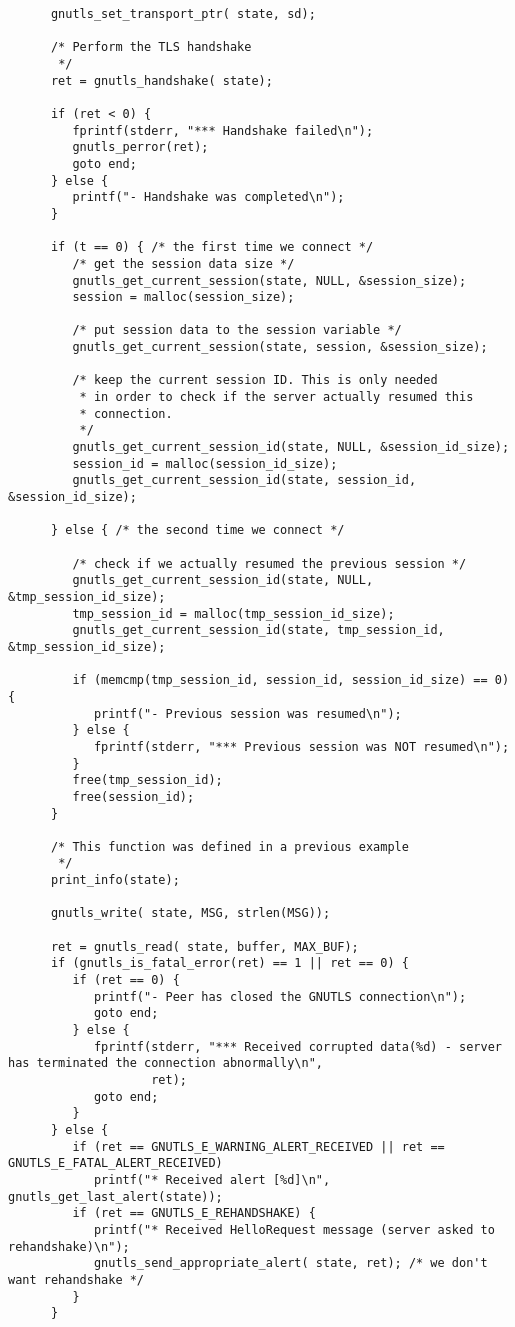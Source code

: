 \begin{verbatim}
      gnutls_set_transport_ptr( state, sd);

      /* Perform the TLS handshake
       */
      ret = gnutls_handshake( state);

      if (ret < 0) {
         fprintf(stderr, "*** Handshake failed\n");
         gnutls_perror(ret);
         goto end;
      } else {
         printf("- Handshake was completed\n");
      }

      if (t == 0) { /* the first time we connect */
         /* get the session data size */
         gnutls_get_current_session(state, NULL, &session_size);
         session = malloc(session_size);

         /* put session data to the session variable */
         gnutls_get_current_session(state, session, &session_size);

         /* keep the current session ID. This is only needed
          * in order to check if the server actually resumed this
          * connection.
          */
         gnutls_get_current_session_id(state, NULL, &session_id_size);
         session_id = malloc(session_id_size);
         gnutls_get_current_session_id(state, session_id, &session_id_size);

      } else { /* the second time we connect */

         /* check if we actually resumed the previous session */
         gnutls_get_current_session_id(state, NULL, &tmp_session_id_size);
         tmp_session_id = malloc(tmp_session_id_size);
         gnutls_get_current_session_id(state, tmp_session_id, &tmp_session_id_size);

         if (memcmp(tmp_session_id, session_id, session_id_size) == 0) {
            printf("- Previous session was resumed\n");
         } else {
            fprintf(stderr, "*** Previous session was NOT resumed\n");
         }
         free(tmp_session_id);
         free(session_id);
      }

      /* This function was defined in a previous example
       */
      print_info(state);

      gnutls_write( state, MSG, strlen(MSG));

      ret = gnutls_read( state, buffer, MAX_BUF);
      if (gnutls_is_fatal_error(ret) == 1 || ret == 0) {
         if (ret == 0) {
            printf("- Peer has closed the GNUTLS connection\n");
            goto end;
         } else {
            fprintf(stderr, "*** Received corrupted data(%d) - server has terminated the connection abnormally\n",
                    ret);
            goto end;
         }
      } else {
         if (ret == GNUTLS_E_WARNING_ALERT_RECEIVED || ret == GNUTLS_E_FATAL_ALERT_RECEIVED)
            printf("* Received alert [%d]\n", gnutls_get_last_alert(state));
         if (ret == GNUTLS_E_REHANDSHAKE) {
            printf("* Received HelloRequest message (server asked to rehandshake)\n");
            gnutls_send_appropriate_alert( state, ret); /* we don't want rehandshake */
         }
      }


\end{verbatim}
